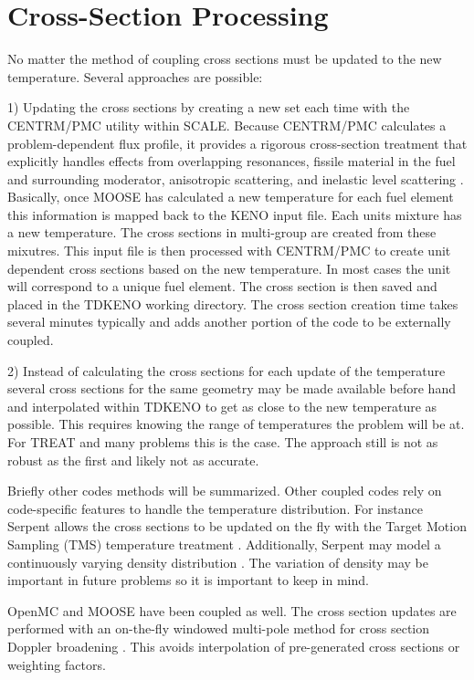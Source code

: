 \documentclass[11pt]{article}
\begin{document}
\section{Cross-Section Processing}
No matter the method of coupling cross sections must be updated to the new temperature. Several approaches are possible:

1)	Updating the cross sections by creating a new set each time with the CENTRM/PMC utility within SCALE. Because CENTRM/PMC calculates a problem-dependent flux profile, it provides a rigorous cross-section treatment that explicitly handles effects from overlapping resonances, fissile material in the fuel and surrounding moderator, anisotropic scattering, and inelastic level scattering \cite{bowman2007overview}.  Basically, once MOOSE has calculated a new temperature for each fuel element this information is mapped back to the KENO input file.  Each units mixture has a new temperature.  The cross sections in multi-group are created from these mixutres.  This input file is then processed with CENTRM/PMC to create unit dependent cross sections  based on the new temperature.  In most cases the unit will correspond to a unique fuel element. The cross section is then saved and placed in the TDKENO working directory.  The cross section creation time takes several minutes typically and adds another portion of the code to be externally coupled.  

2)  Instead of calculating the cross sections for each update of the temperature several cross sections for the same geometry may be made available before hand and interpolated within TDKENO to get as close to the new temperature as possible.  This requires knowing the range of temperatures the problem will be at.  For TREAT and many problems this is the case.  The approach still is not as robust as the first and likely not as accurate.

Briefly other codes methods will be summarized.  Other coupled codes rely on code-specific features to handle the temperature distribution.  For instance Serpent allows the cross sections to be updated on the fly with the Target Motion Sampling (TMS) temperature treatment \cite{viitanen2012explicit}. Additionally, Serpent may model a continuously varying density distribution \cite{leppanen2013modeling}.  The variation of density may be important in future problems so it is important to keep in mind.

OpenMC and MOOSE have been coupled as well.  The cross section updates are performed with an on-the-fly windowed multi-pole method for cross section Doppler broadening \cite{josey2016windowed}. This avoids interpolation of pre-generated cross sections or  weighting factors.  
\end{document}
